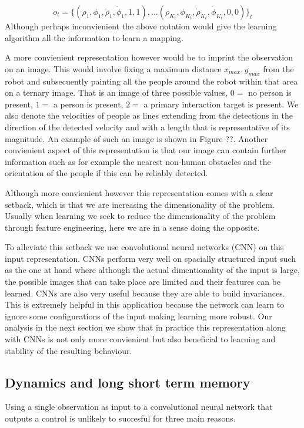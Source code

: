 \documentclass[letterpaper, 10 pt, conference]{ieeeconf}
\begin{document}
\begin{equation}
 	o_t = \{(\rho_1,\phi_1,\dot{\rho}_1,\dot{\phi}_1,1,1),... (\rho_{K_t},\phi_{K_t},\dot{\rho}_{K_t},\dot{\phi}_{K_t},0,0)\}_t
\end{equation}
Although perhaps inconvienient the above notation would give the learning algorithm all the information to learn a mapping. 

A more convienient representation however would be to imprint the observation on an image. This would involve fixing a maximum distance $x_{max},y_{max}$ from the robot and subsecuently painting all the people around the robot within that area on a ternary image. That is an image of three possible values, $0=$ no person is present, $1=$ a person is present, $2=$ a primary interaction target is present. We also denote the velocities of people as lines extending from the detections in the direction of the detected velocity and with a length that is representative of its magnitude. An example of such an image is shown in Figure ??. Another convienient aspect of this representation is that our image can contain further information such as for example the nearest non-human obstacles and the orientation of the people if this can be reliably detected. 

Although more convienient however this representation comes with a clear setback, which is that we are increasing the dimensionality of the problem. Usually when learning we seek to reduce the dimensionality of the problem through feature engineering, here we are in a sense doing the opposite. 

To alleviate this setback we use convolutional neural networks (CNN) on this input representation. CNNs perform very well on spacially structured input such as the one at hand where although the actual dimentionality of the input is large, the possible images that can take place are limited and their features can be learned. CNNs are also very useful because they are able to build invariances. This is extremely helpful in this application because the network can learn to ignore some configurations of the input making learning more robust. Our analysis in the next section we show that in practice this representation along with CNNs is not only more convienient but also beneficial to learning and stability of the resulting behaviour.

\subsection{Dynamics and long short term memory}
Using a single observation as input to a convolutional neural network that outputs a control is unlikely to succesful for three main reasons.
\end{document}
